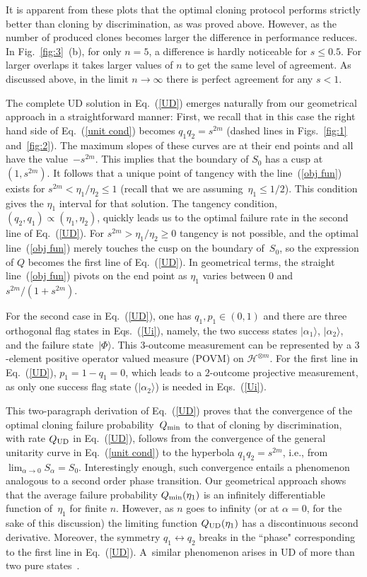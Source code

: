 \documentclass[aps,prl,twocolumn,showpacs]{revtex4}
\begin{document}
It is apparent from these plots that the optimal cloning protocol performs strictly better than cloning by discrimination, as was proved above. However, as the number of produced clones becomes larger the difference in performance reduces. In Fig.~\ref{fig:3}~(b), for only $n=5$, a difference is hardly noticeable for $s\le 0.5$. For larger overlaps it takes larger values of $n$ to get the same level of agreement. As discussed above, in the limit $n\to\infty$ there is perfect agreement for any $s<1$.

The complete UD solution in Eq.~(\ref{UD}) emerges naturally from our geometrical approach in a straightforward manner:
First, we recall that in this case the right hand side of Eq.~(\ref{unit cond}) becomes $q_1 q_2=s^{2m}$ (dashed lines in Figs.~\ref{fig:1} and~\ref{fig:2}). The maximum slopes of these curves are at their end points and all have the value~$-s^{2m}$. This implies that the boundary of $S_0$ has a cusp at $(1,s^{2m})$. It follows that a unique point of tangency with the line~(\ref{obj fun}) exists for $s^{2m}<\eta_1/\eta_2\le1$ (recall that we are assuming~$\eta_1\le1/2$). This condition gives the $\eta_1$ interval for that solution.  The tangency condition, $(q_2,q_1)\propto (\eta_1,\eta_2)$, quickly leads us to the optimal failure rate in  the second line of Eq.~(\ref{UD}). For $s^{2m}>\eta_1/\eta_2\ge0$ tangency is not possible, and the optimal line~(\ref{obj fun}) merely touches the cusp on the boundary of~$S_0$, so the expression of $Q$ becomes the first line of Eq.~(\ref{UD}). In geometrical terms, the straight line~(\ref{obj fun}) pivots on the end point as $\eta_1$ varies between $0$ and $s^{2m}/(1+s^{2m})$.


For the second case in Eq.~(\ref{UD}), one has $q_1,p_1\in(0,1)$ and there are three orthogonal flag states in Eqs.~(\ref{Ui}), namely, the two success states $|\alpha_1\rangle$, $|\alpha_2\rangle$, and the failure state~$|\Phi\rangle$. This $3$-outcome measurement can be represented by a $3$-element positive operator valued measure (POVM) on ${\mathscr H}^{\otimes m}$. For the first line in Eq.~(\ref{UD}), $p_1=1-q_1=0$, which leads to a $2$-outcome projective measurement, as only one success flag state ($|\alpha_2\rangle$) is needed in Eqs.~(\ref{Ui}). 

This two-paragraph derivation of Eq.~(\ref{UD}) proves that the convergence of the optimal cloning failure probability~$Q_{\rm min}$ to that of cloning by discrimination, with rate $Q_{\rm UD}$ in Eq.~(\ref{UD}), follows from the convergence of the general unitarity curve in Eq.~(\ref{unit cond}) to the hyperbola $q_1q_2=s^{2m}$, i.e., from $\lim_{\alpha\to0} S_\alpha=S_0$. Interestingly enough, such convergence entails a phenomenon analogous to a second order phase transition. Our geometrical approach shows that the average failure probability $Q_{\rm min}(\eta_1)$ is an infinitely differentiable function of~$\eta_1$ for finite $n$. However, as $n$ goes to infinity (or at $\alpha=0$, for the sake of this discussion) the limiting function $Q_{\rm UD}(\eta_1)$ has a discontinuous second derivative. Moreover, the symmetry $q_1\leftrightarrow q_2$ breaks  in the ``phase" corresponding to the first line in Eq.~(\ref{UD}). A~similar phenomenon arises in UD of more than two pure states~\cite{Bergou1}.
\end{document}
